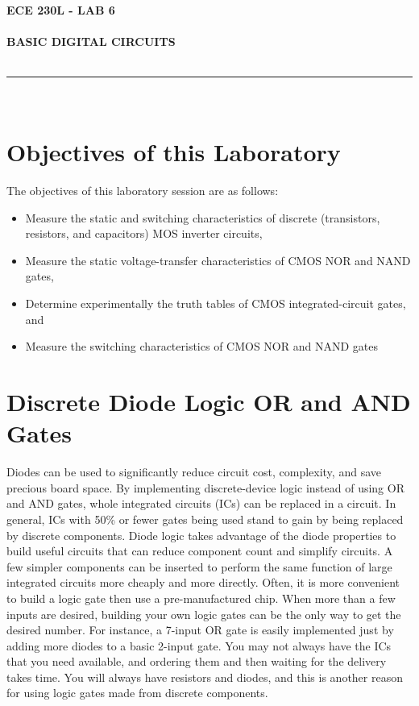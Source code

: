 \documentclass[12pt]{../manual}
\begin{document}
\begin{center}
\textbf{\huge ECE 230L - LAB 6}\\~\\
\textbf{\large BASIC DIGITAL CIRCUITS}\\~\\
\rule{6.5in}{0.5mm}\\
\end{center}

\tableofcontents

\listoffigures

\newpage
%
\section{Objectives of this Laboratory}
The objectives of this laboratory session are as follows:
\begin{itemize}
\item Measure the static and switching characteristics of discrete (transistors, resistors, and capacitors) MOS inverter circuits,
\item Measure the static voltage-transfer characteristics of CMOS NOR and NAND gates,
\item Determine experimentally the truth tables of CMOS integrated-circuit gates, and
\item Measure the switching characteristics of CMOS NOR and NAND gates
\end{itemize}

\section{Discrete Diode Logic OR and AND Gates}
Diodes can be used to significantly reduce circuit cost, complexity, and save precious board space. By implementing discrete-device logic instead of using OR and AND gates, whole integrated circuits (ICs) can be replaced in a circuit. In general, ICs with 50\% or fewer gates being used stand to gain by being replaced by discrete components. Diode logic takes advantage of the diode properties to build useful circuits that can reduce component count and simplify circuits. A few simpler components can be inserted to perform the same function of large integrated circuits more cheaply and more directly. Often, it is more convenient to build a logic gate then use a pre-manufactured chip. When more than a few inputs are desired, building your own logic gates can be the only way to get the desired number. For instance, a 7-input OR gate is easily implemented just by adding more diodes to a basic 2-input gate. You may not always have the ICs that you need available, and ordering them and then waiting for the delivery takes time. You will always have resistors and diodes, and this is another reason for using logic gates made from discrete components.
\end{document}
